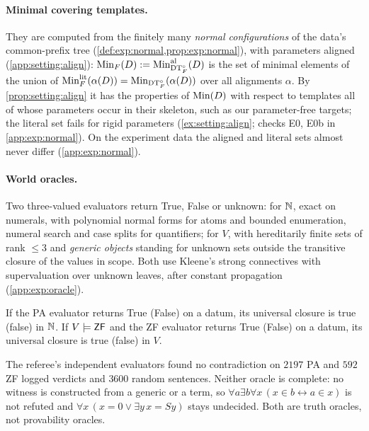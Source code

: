 \paragraph{Minimal covering templates.}
They are computed from the finitely many \emph{normal configurations} of the data's common-prefix tree (\cref{def:exp:normal,prop:exp:normal}), with parameters aligned (\cref{app:setting:align}): $\mathrm{Min}_F(D):=\mathrm{Min}^{\mathrm{al}}_{\mathrm{DT}^{\circ}_{F}}(D)$ is the set of minimal elements of the union of $\mathrm{Min}^{\mathrm{lit}}_F(\alpha(D))=\mathrm{Min}_{\mathrm{DT}^{\circ}_{F}}(\alpha(D))$ over all alignments $\alpha$. By \cref{prop:setting:align} it has the properties of $\mathrm{Min}(D)$ with respect to templates all of whose parameters occur in their skeleton, such as our parameter-free targets; the literal set fails for rigid parameters (\cref{ex:setting:align}; checks E0, E0b in \cref{app:exp:normal}). On the experiment data the aligned and literal sets almost never differ (\cref{app:exp:normal}).

\paragraph{World oracles.}
Two three-valued evaluators return True, False or unknown: for $\mathbb{N}$, exact on numerals, with polynomial normal forms for atoms and bounded enumeration, numeral search and case splits for quantifiers; for $V$, with hereditarily finite sets of rank $\le3$ and \emph{generic objects} standing for unknown sets outside the transitive closure of the values in scope. Both use Kleene's strong connectives with supervaluation over unknown leaves, after constant propagation (\cref{app:exp:oracle}).

\begin{proposition}\label{prop:exp:oracle}
If the PA evaluator returns True (False) on a datum, its universal closure is true (false) in $\mathbb{N}$. If $V\models\mathsf{ZF}$ and the ZF evaluator returns True (False) on a datum, its universal closure is true (false) in $V$.
\end{proposition}

The referee's independent evaluators found no contradiction on $2197$ PA and $592$ ZF logged verdicts and $3600$ random sentences. Neither oracle is complete: no witness is constructed from a generic or a term, so $\forall a\exists b\forall x\,(x\in b\leftrightarrow a\in x)$ is not refuted and $\forall x\,(x=0\vee\exists y\,x=Sy)$ stays undecided. Both are truth oracles, not provability oracles.

